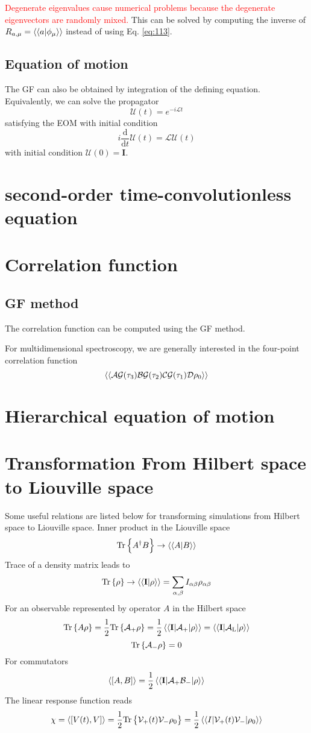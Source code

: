 \documentclass[a4paper,12pt]{book}
\newcommand{\mc}[1]{\mathcal{#1}}
\newcommand{\eq}[1]{Eq. \eqref{#1}}
\newcommand{\bbraket}[1]{\braket{\braket{#1}}}
\newcommand{\half}{\frac{1}{2}}
\renewcommand{\bf}[1]{\mathbf{#1}}
\newcommand{\be}{\begin{equation}}
\newcommand{\ee}{\end{equation}}
\renewcommand{\bf}[1]{\mathbf{#1}}
\renewcommand{\bf}{\mathbf}
\newcommand{\dt}{\frac{\text{d}}{\text{d}t}}
\newcommand{\Tr}[1]{\text{Tr}\cbr{#1}}
\newcommand{\red}[1]{\textcolor{red}{#1}}
\begin{document}
\red{Degenerate eigenvalues cause numerical problems because the degenerate eigenvectors are randomly mixed.}
This can be solved by computing the inverse of $R_{a, \mu} = \bbraket{a| \phi_\mu}$ instead of using \eq{eq:113}.

\subsection{Equation of motion}
The GF can also be obtained by integration of the defining equation.
Equivalently, we can solve the propagator
\be
\mc{U}(t) = e^{-i \mc{L} t}
\ee
satisfying the EOM with initial condition
\be
i \dt \mc{U}(t) =  \mc{L}\mc{U}(t)
\ee
with initial condition $\mc{U}(0) = \bf I$.

\section{second-order time-convolutionless equation}

\section{Correlation function}
\subsection{GF method}
The correlation function can be computed using the GF method.

For multidimensional spectroscopy, we are generally interested in the four-point correlation function
\be
\bbraket{\mc{A} \mc{G}(\tau_3)\mc{B} \mc{G}(\tau_2) \mc{C} \mc{G}(\tau_1) \mc{D}\rho_0 }
\ee

\section{Hierarchical equation of motion}

\section{Transformation From Hilbert space to Liouville space}
\label{sec:ls}
Some useful relations are listed below for transforming simulations from Hilbert space to Liouville space.
Inner product in the Liouville space
\be
\Tr{A^\dag B} \rightarrow \bbraket{A|B}
\ee
Trace of a density matrix leads to
\be
\Tr{\rho} \rightarrow \bbraket{\bf I|\rho} = \sum_{\alpha, \beta} I_{\alpha \beta} \rho_{\alpha \beta}
\ee
For an observable represented by operator ${A}$ in the Hilbert space
\be \Tr{A \rho } = \half \Tr{\mc{A}_+ \rho} = \half \bbraket{\bf I| \mc{A}_+ |\rho} = \bbraket{ \bf I|\mc{A}_\text{L}| \rho}
\ee
\be \Tr{\mc{A}_- \rho} = 0 \ee
For commutators
\be
\braket{[A, B]} = \half \bbraket{\bf I| \mc{A}_+\mc{B}_-|\rho}
\ee
The linear response function reads
\be
\chi = \braket{[V(t), V]}  = \half \Tr{\mc{V}_+(t) \mc{V}_- \rho_0} =
\half \bbraket{I|\mc{V}_+(t) \mc{V}_- |\rho_0}
\ee
\end{document}
